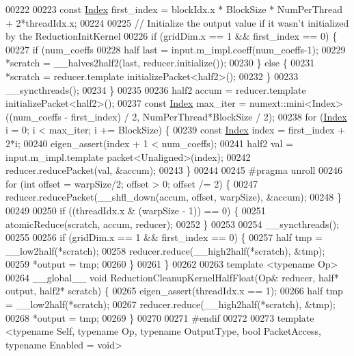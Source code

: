 \begin{DoxyCode}
00222 
00223   \textcolor{keyword}{const} \hyperlink{namespace_eigen_a62e77e0933482dafde8fe197d9a2cfde}{Index} first\_index = blockIdx.x * BlockSize * NumPerThread + 2*threadIdx.x;
00224 
00225   \textcolor{comment}{// Initialize the output value if it wasn't initialized by the ReductionInitKernel}
00226   \textcolor{keywordflow}{if} (gridDim.x == 1 && first\_index == 0) \{
00227     \textcolor{keywordflow}{if} (num\_coeffs %
00228       half last = input.m\_impl.coeff(num\_coeffs-1);
00229       *scratch = \_\_halves2half2(last, reducer.initialize());
00230     \} \textcolor{keywordflow}{else} \{
00231       *scratch = reducer.template initializePacket<half2>();
00232     \}
00233     \_\_syncthreads();
00234   \}
00235 
00236   half2 accum = reducer.template initializePacket<half2>();
00237   \textcolor{keyword}{const} \hyperlink{namespace_eigen_a62e77e0933482dafde8fe197d9a2cfde}{Index} max\_iter = numext::mini<Index>((num\_coeffs - first\_index) / 2, NumPerThread*BlockSize / 
      2);
00238   \textcolor{keywordflow}{for} (\hyperlink{namespace_eigen_a62e77e0933482dafde8fe197d9a2cfde}{Index} i = 0; i < max\_iter; i += BlockSize) \{
00239     \textcolor{keyword}{const} \hyperlink{namespace_eigen_a62e77e0933482dafde8fe197d9a2cfde}{Index} index = first\_index + 2*i;
00240     eigen\_assert(index + 1 < num\_coeffs);
00241     half2 val = input.m\_impl.template packet<Unaligned>(index);
00242     reducer.reducePacket(val, &accum);
00243   \}
00244 
00245 \textcolor{preprocessor}{#pragma unroll}
00246   \textcolor{keywordflow}{for} (\textcolor{keywordtype}{int} offset = warpSize/2; offset > 0; offset /= 2) \{
00247     reducer.reducePacket(\_\_shfl\_down(accum, offset, warpSize), &accum);
00248   \}
00249 
00250   \textcolor{keywordflow}{if} ((threadIdx.x & (warpSize - 1)) == 0) \{
00251     atomicReduce(scratch, accum, reducer);
00252   \}
00253 
00254   \_\_syncthreads();
00255 
00256   \textcolor{keywordflow}{if} (gridDim.x == 1 && first\_index == 0) \{
00257     half tmp = \_\_low2half(*scratch);
00258     reducer.reduce(\_\_high2half(*scratch), &tmp);
00259     *output = tmp;
00260   \}
00261 \}
00262 
00263 \textcolor{keyword}{template} <\textcolor{keyword}{typename} Op>
00264 \_\_global\_\_ \textcolor{keywordtype}{void} ReductionCleanupKernelHalfFloat(Op& reducer, half* output, half2* scratch) \{
00265   eigen\_assert(threadIdx.x == 1);
00266   half tmp = \_\_low2half(*scratch);
00267   reducer.reduce(\_\_high2half(*scratch), &tmp);
00268   *output = tmp;
00269 \}
00270 
00271 \textcolor{preprocessor}{#endif}
00272 
00273 \textcolor{keyword}{template} <\textcolor{keyword}{typename} Self, \textcolor{keyword}{typename} Op, \textcolor{keyword}{typename} OutputType, \textcolor{keywordtype}{bool} PacketAccess, \textcolor{keyword}{typename} Enabled = \textcolor{keywordtype}{void}>

\end{DoxyCode}
